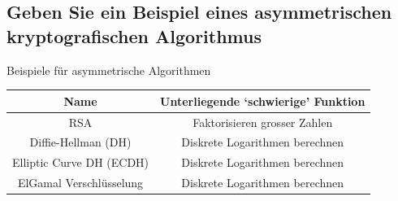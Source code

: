 \subsection*{Geben Sie ein Beispiel eines asymmetrischen kryptografischen Algorithmus}
Beispiele für asymmetrische Algorithmen\\
\begin{tabular}{|c|c|}
    \hline
        Name&Unterliegende `schwierige' Funktion\\
        \hline
        RSA&Faktorisieren grosser Zahlen\\
        Diffie-Hellman (DH)&Diskrete Logarithmen berechnen\\
        Elliptic Curve DH (ECDH) &Diskrete Logarithmen berechnen\\
        ElGamal Verschlüsselung&Diskrete Logarithmen berechnen\\
    \hline
\end{tabular}